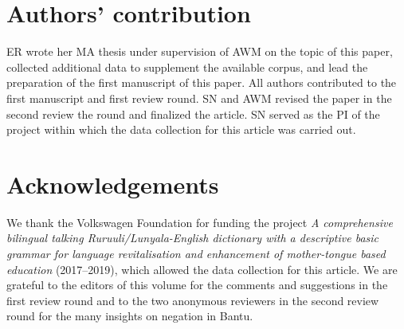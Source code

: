 \documentclass[output=paper,colorlinks,citecolor=brown,draftmode]{langscibook}
\begin{document}

\section*{Authors' contribution}
ER wrote her MA thesis under supervision of AWM on the topic of this paper, collected additional data to supplement the available corpus, and lead the preparation of the first manuscript of this paper. 
All authors contributed to the first manuscript and first review round. 
SN and AWM revised the paper in the second review the round and finalized the article. 
SN served as the PI of the project within which the data collection for this article was carried out.

\section*{Acknowledgements}
We thank the Volkswagen Foundation for funding the project \textit{A comprehensive bilingual talking Ruruuli/Lunyala-English dictionary with a descriptive basic grammar for language revitalisation and enhancement of mother-tongue based education} (2017--2019), which allowed the data collection for this article.
We are grateful to the editors of this volume for the comments and suggestions in the first review round and to the two anonymous reviewers in the second review round for the many insights on negation in Bantu.
\end{document}
